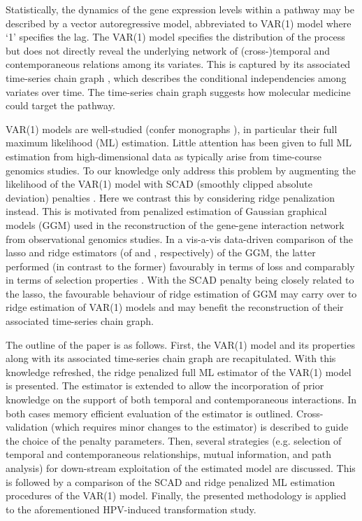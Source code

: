 Statistically, the dynamics of the gene expression levels within a pathway may be described by a vector autoregressive model, abbreviated to VAR(1) model where `1' specifies the lag. The VAR(1) model specifies the distribution of the process but does not directly reveal the underlying network of (cross-)temporal and contemporaneous relations among its variates. This is captured by its associated time-series chain graph \citep{Dahlhaus2000}, which describes the conditional independencies among variates over time. The time-series chain graph suggests how molecular medicine could target the pathway.

VAR(1) models are well-studied (confer monographs \cite{Hamilton1994, Lutkepohl2005}), in particular their full maximum likelihood (ML) estimation. Little attention has been given to full ML estimation from high-dimensional data as typically arise from time-course genomics studies. To our knowledge only \cite{Abegaz2013} address this problem by augmenting the likelihood of the VAR(1) model with SCAD (smoothly clipped absolute deviation) penalties \cite{Fan2001}. Here we contrast this by considering ridge penalization instead. This is motivated from penalized estimation of Gaussian graphical models (GGM) used in the reconstruction of the gene-gene interaction network from observational genomics studies. In a vis-a-vis data-driven comparison of the lasso and ridge estimators (of \cite{Friedman2008} and \cite{Wieringen2016}, respectively) of the GGM, the latter performed (in contrast to the former) favourably in terms of loss and comparably in terms of selection properties \cite{Wieringen2016}. With the SCAD penalty being closely related to the lasso, the favourable behaviour of ridge estimation of GGM may carry over to ridge estimation of VAR(1) models and may benefit the reconstruction of their associated time-series chain graph.

The outline of the paper is as follows. First, the VAR(1) model and its properties along with its associated time-series chain graph are recapitulated. With this knowledge refreshed, the ridge penalized full ML estimator of the VAR(1) model is presented. The estimator is extended to allow the incorporation of prior knowledge on the support of both temporal and contemporaneous interactions. In both cases memory efficient evaluation of the estimator is outlined. Cross-validation (which requires minor changes to the estimator) is described to guide the choice of the penalty parameters. Then, several strategies (e.g. selection of temporal and contemporaneous relationships, mutual information, and path analysis) for down-stream exploitation of the estimated model are discussed. This is followed by a comparison of the SCAD and ridge penalized ML estimation procedures of the VAR(1) model. Finally, the presented methodology is applied to the aforementioned HPV-induced transformation study.


